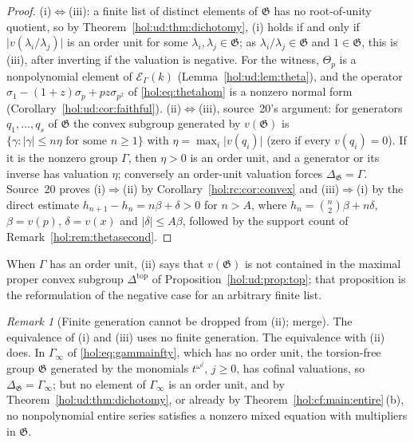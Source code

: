 \documentclass[11pt]{article}
\numberwithin{equation}{section}
\theoremstyle{definition}
\theoremstyle{remark}
\newtheorem{remark}[theorem]{Remark}
\newcommand{\abs}[1]{\lvert#1\rvert}
\newcommand{\EK}{\mathcal E_\Gamma(k)}
\begin{document}
\begin{proof}
(i)$\Leftrightarrow$(iii): a finite list of distinct elements of $\mathfrak G$
has no root-of-unity quotient, so by Theorem~\ref{hol:ud:thm:dichotomy},
(i) holds if and only if $\abs{v(\lambda_i/\lambda_j)}$ is an order unit for
some $\lambda_i,\lambda_j\in\mathfrak G$; as $\lambda_i/\lambda_j\in\mathfrak G$
and $1\in\mathfrak G$, this is (iii), after inverting if the valuation is
negative. For the witness, $\Theta_p$ is a nonpolynomial element of $\EK$
(Lemma~\ref{hol:ud:lem:theta}), and the operator
$\sigma_1-(1+z)\sigma_p+pz\sigma_{p^2}$ of \eqref{hol:eq:thetahom} is a nonzero
normal form (Corollary~\ref{hol:ud:cor:faithful}).
(ii)$\Leftrightarrow$(iii), source~20's argument: for generators
$q_1,\ldots,q_s$ of $\mathfrak G$ the convex subgroup generated by
$v(\mathfrak G)$ is $\{\gamma:\abs\gamma\le n\eta\text{ for some }n\ge1\}$ with
$\eta=\max_i\abs{v(q_i)}$ (zero if every $v(q_i)=0$). If it is the nonzero
group $\Gamma$, then $\eta>0$ is an order unit, and a generator or its inverse
has valuation $\eta$; conversely an order-unit valuation forces
$\Delta_{\mathfrak G}=\Gamma$. Source~20 proves (i)$\Rightarrow$(ii) by
Corollary~\ref{hol:rc:cor:convex} and (iii)$\Rightarrow$(i) by the direct
estimate $h_{n+1}-h_n=n\beta+\delta>0$ for $n>A$, where $h_n=\binom n2\beta+n\delta$,
$\beta=v(p)$, $\delta=v(x)$ and $\abs\delta\le A\beta$, followed by the
support count of Remark~\ref{hol:rem:thetasecond}.
\end{proof}

When $\Gamma$ has an order unit, (ii) says that $v(\mathfrak G)$ is not
contained in the maximal proper convex subgroup $\Delta^{\mathrm{top}}$ of
Proposition~\ref{hol:ud:prop:top}; that proposition is the reformulation of
the negative case for an arbitrary finite list.

\begin{remark}[Finite generation cannot be dropped from (ii); merge]
\label{hol:rc:rem:finitegeneration}
The equivalence of (i) and (iii) uses no finite generation. The equivalence
with (ii) does. In $\Gamma_\infty$ of \eqref{hol:eq:gammainfty}, which has no
order unit, the torsion-free group $\mathfrak G$ generated by the monomials
$t^{\omega^j}$, $j\ge0$, has cofinal valuations, so $\Delta_{\mathfrak
G}=\Gamma_\infty$; but no element of $\Gamma_\infty$ is an order unit, and by
Theorem~\ref{hol:ud:thm:dichotomy}, or already by
Theorem~\ref{hol:cf:main:entire}\,(b), no nonpolynomial entire series satisfies
a nonzero mixed equation with multipliers in $\mathfrak G$.
\end{remark}
\end{document}
